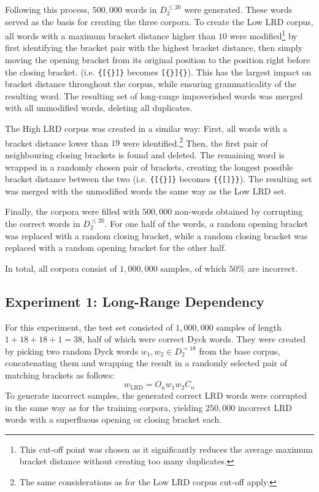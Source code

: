 Following this process, $500{,}000$ words in $D_{2}^{\leq 20}$ were generated. These words served as the basis for creating the three corpora. To create the Low LRD corpus, all words with a maximum bracket distance higher than $10$ were modified\footnote{This cut-off point was chosen as it significantly reduces the average maximum bracket distance without creating too many duplicates.} by first identifying the bracket pair with the highest bracket distance, then simply moving the opening bracket from its original position to the position right before the closing bracket. (i.e. \texttt{\{[\{\}]\}} becomes \texttt{[\{\}]\{\}}). This has the largest impact on bracket distance throughout the corpus, while ensuring grammaticality of the resulting word. The resulting set of long-range impoverished words was merged with all unmodified words, deleting all duplicates.

The High LRD corpus was created in a similar way: First, all words with a bracket distance lower than $19$ were identified.\footnote{The same considerations as for the Low LRD corpus cut-off apply.} Then, the first pair of neighbouring closing brackets is found and deleted. The remaining word is wrapped in a randomly chosen pair of brackets, creating the longest possible bracket distance between the two (i.e. \texttt{\{[\{\}]\}} becomes \texttt{\{\{[]\}\}}). The resulting set was merged with the unmodified words the same way as the Low LRD set.

Finally, the corpora were filled with $500{,}000$ non-words obtained by corrupting the correct words in $D_{2}^{\leq 20}$. For one half of the words, a random opening bracket was replaced with a random closing bracket, while a random closing bracket was replaced with a random opening bracket for the other half.

In total, all corpora consist of $1{,}000{,}000$ samples, of which $50\%$ are incorrect.

\subsection{Experiment 1: Long-Range Dependency}\label{LRD}
For this experiment, the test set consisted of $1{,}000{,}000$ samples of length $1+18+18+1=38$, half of which were correct Dyck words. They were created by picking two random Dyck words $w_{1}, w_{2} \in D_{2}^{=18}$ from the base corpus, concatenating them and wrapping the result in a randomly selected pair of matching brackets as follows:
\[
	w_{\text{LRD}} = O_{n}w_{1}w_{2}C_{n}
\]
To generate incorrect samples, the generated correct LRD words were corrupted in the same way as for the training corpora, yielding $250{,}000$ incorrect LRD words with a superfluous opening or closing bracket each.

